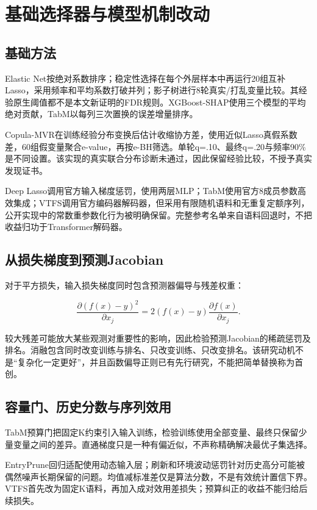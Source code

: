 \documentclass[UTF8,11pt,a4paper]{ctexart}
\begin{document}
\section{基础选择器与模型机制改动}

\subsection{基础方法}

Elastic Net按绝对系数排序；稳定性选择在每个外层样本中再运行20组互补Lasso，采用频率和平均系数打破并列；影子树进行8轮真实/打乱变量比较。其经验原生阈值都不是本文新证明的FDR规则。XGBoost-SHAP使用三个模型的平均绝对贡献，TabM以每列三次置换的误差增量排序。

Copula-MVR在训练经验分布变换后估计收缩协方差\cite{ledoit2004}，使用近似Lasso真假系数差，60组假变量聚合e-value，再按e-BH筛选。单轮q=.10、最终q=.20与频率90\%是不同设置。该实现的真实联合分布诊断未通过，因此保留经验比较，不授予真实发现证书。

Deep Lasso调用官方输入梯度惩罚，使用两层MLP；TabM使用官方8成员参数高效集成；VTFS调用官方编码器解码器，但采用有限随机语料和无重复定额序列，公开实现中的常数重参数化行为被明确保留。完整参考名单来自语料回退时，不把收益归功于Transformer解码器。

\subsection{从损失梯度到预测Jacobian}

对于平方损失，输入损失梯度同时包含预测器偏导与残差权重：

\[
\frac{\partial (f(x)-y)^2}{\partial x_j}
=2(f(x)-y)\frac{\partial f(x)}{\partial x_j}.
\]

较大残差可能放大某些观测对重要性的影响，因此检验预测Jacobian的稀疏惩罚及排名。消融包含同时改变训练与排名、只改变训练、只改变排名。该研究动机不是``复杂化一定更好''，并且函数偏导正则已有先行研究，不能把简单替换称为首创。

\subsection{容量门、历史分数与序列效用}

TabM预算门把固定K约束引入输入训练，检验训练使用全部变量、最终只保留少量变量之间的差异。直通梯度只是一种有偏近似，不声称精确解决最优子集选择。

EntryPrune回归适配使用动态输入层；刷新和环境波动惩罚针对历史高分可能被偶然噪声长期保留的问题。均值减标准差仅是算法分数，不是有效统计置信下界。VTFS首先改为固定K语料，再加入成对效用差损失；预算纠正的收益不能归给后续损失。
\end{document}
